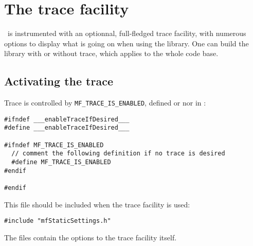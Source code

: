 



\chapter{The trace facility}


\mf\ is instrumented with an optionnal, full-fledged trace facility, with numerous options to display what is going on when using the library.
One can build the library with or without trace, which applies to the whole code base.

\section{Activating the trace}

Trace is controlled by {\tt MF_TRACE_IS_ENABLED}, defined or nor in :

\begin{lstlisting}[language=CPlusPlus]
#ifndef ___enableTraceIfDesired___
#define ___enableTraceIfDesired___

#ifndef MF_TRACE_IS_ENABLED
  // comment the following definition if no trace is desired
  #define MF_TRACE_IS_ENABLED
#endif

#endif
\end{lstlisting}

This file should be included when the trace facility is used:
\begin{lstlisting}[language=CPlusPlus]
#include "mfStaticSettings.h"
\end{lstlisting}

The files  contain the options to the trace facility itself.

